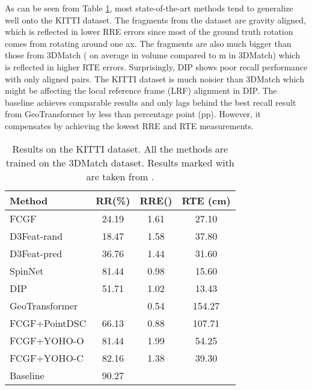 \documentclass{bmvc2k}
\begin{document}
As can be seen from Table \ref{tab:KITTI-results}, most state-of-the-art methods tend to generalize well onto the KITTI dataset. The fragments from the dataset are gravity aligned, which is reflected in lower RRE errors since most of the ground truth rotation comes from rotating around one ax. The fragments are also much bigger than those from 3DMatch ( on average in volume compared to m in 3DMatch) which is reflected in higher RTE errors.
Surprisingly, DIP shows poor recall performance with only  aligned pairs. The KITTI dataset is much noisier than 3DMatch which might be affecting the local reference frame (LRF) alignment in DIP. 
The baseline achieves comparable results and only lags behind the best recall result from GeoTransformer by less than  percentage point (pp). However, it compensates by achieving the lowest RRE and RTE measurements.


\begin{table}[h!]
\scriptsize
\begin{center}
\begin{tabular}{l|c|c|c}
\hline
Method      & RR(\%) & RRE() & RTE (cm) \\
\hline
FCGF  \cite{fully-convolutional-geometric-features}      & 24.19 & 1.61  & 27.10    \\
D3Feat-rand \cite{d3feat-joint-learning-of-dense-features} & 18.47 & 1.58  & 37.80    \\
D3Feat-pred \cite{d3feat-joint-learning-of-dense-features}& 36.76 & 1.44  & 31.60    \\
SpinNet   \cite{SpinNet}  & 81.44 & 0.98  & 15.60    \\
DIP       & 51.71  & 1.02   & 13.43  \\
GeoTransformer \cite{geometric-transformer-for-fast-registration} &   & 0.54 &  154.27 \\
FCGF+PointDSC \cite{PointDSC} & 66.13 & 0.88   & 107.71      \\
FCGF+YOHO-O \cite{YOHO} & 81.44  & 1.99  & 54.25      \\
FCGF+YOHO-C \cite{YOHO} & 82.16  & 1.38   &  39.30     \\
\hline
Baseline  & 90.27 &  &  \\
\hline
\end{tabular}
\caption{Results on the KITTI dataset. All the methods are trained on the 3DMatch dataset. Results marked with  are taken from \cite{SpinNet}.}
\label{tab:KITTI-results}
\end{center}
\end{table}
 
\end{document}
